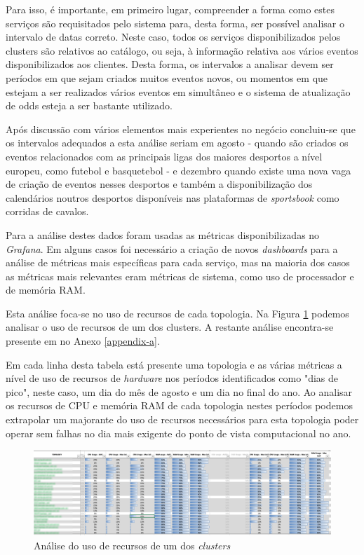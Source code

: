 Para isso, é importante, em primeiro lugar, compreender a forma como estes serviços são requisitados
pelo sistema para, desta forma, ser possível analisar o intervalo de datas correto. Neste caso,
todos os serviços disponibilizados pelos \glspl{cluster} são relativos ao catálogo, ou seja,
à informação relativa aos vários eventos disponibilizados aos clientes. Desta forma, os intervalos
a analisar devem ser períodos em que sejam criados muitos eventos novos, ou momentos em que
estejam a ser realizados vários eventos em simultâneo e o sistema de atualização de \glspl{odd}
esteja a ser bastante utilizado.

Após discussão com vários elementos mais experientes no negócio concluiu-se que os intervalos
adequados a esta análise seriam em agosto - quando são criados os eventos relacionados com as
principais ligas dos maiores desportos a nível europeu, como futebol e basquetebol - e dezembro 
quando existe uma nova vaga de criação de eventos nesses desportos e também a disponibilização 
dos calendários noutros desportos disponíveis nas plataformas de \textit{sportsbook} como
corridas de cavalos.

Para a análise destes dados foram usadas as métricas disponibilizadas no \textit{Grafana}. Em alguns
casos foi necessário a criação de novos \textit{dashboards} para a análise de métricas mais 
específicas para cada serviço, mas na maioria dos casos as métricas mais relevantes eram métricas 
de sistema, como uso de processador e de memória RAM.

Esta análise foca-se no uso de recursos de cada topologia. Na Figura \ref{analise-ofs} podemos
analisar o uso de recursos de um dos \glspl{cluster}. A restante análise encontra-se
presente em no Anexo \ref{appendix-a}.

Em cada linha desta tabela está presente uma topologia e as várias métricas a nível de uso de 
recursos de \textit{hardware} nos períodos identificados como "dias de pico", neste caso, um dia 
do mês de agosto e um dia no final do ano. Ao analisar os recursos de \ac{CPU} e memória RAM de 
cada topologia nestes períodos podemos extrapolar um majorante do uso de recursos necessários para
esta topologia poder operar sem falhas no dia mais exigente do ponto de vista computacional no ano.

\begin{figure}[H]
  \centerline{\includegraphics[scale=0.27]{media/content/analise/analise-ofs.png}}
  \caption{Análise do uso de recursos de um dos \textit{clusters}}
  \label{analise-ofs}
\end{figure}


